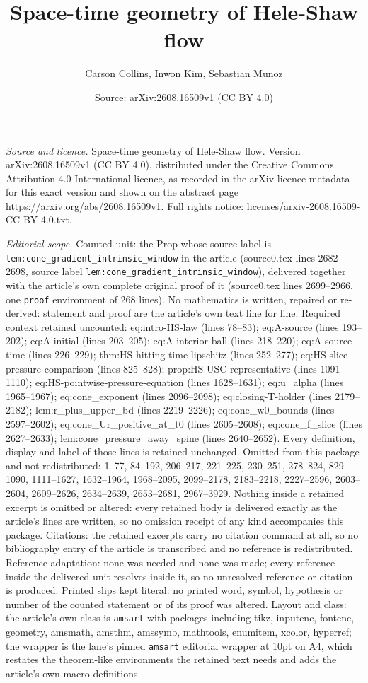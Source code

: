 \documentclass[10pt,a4paper]{amsart}
\title[Space-time geometry of Hele-Shaw flow]{Space-time geometry of Hele-Shaw flow}
\author{Carson Collins, Inwon Kim, Sebastian Munoz}
\date{Source: arXiv:2608.16509v1 (CC BY 4.0)}
\begin{document}
\maketitle

\noindent\emph{Source and licence.} Space-time geometry of Hele-Shaw flow. Version arXiv:2608.16509v1 (CC BY 4.0), distributed under the Creative Commons Attribution 4.0 International licence, as recorded in the arXiv licence metadata for this exact version and shown on the abstract page https://arxiv.org/abs/2608.16509v1. Full rights notice: licenses/arxiv-2608.16509-CC-BY-4.0.txt.\par\smallskip

\noindent\textit{Editorial scope.} Counted unit: the Prop whose source label is \texttt{lem:cone\_gradient\_intrinsic\_window} in the article (source0.tex lines 2682--2698, source label \texttt{lem:cone\_gradient\_intrinsic\_window}), delivered together with the article's own complete original proof of it (source0.tex lines 2699--2966, one \texttt{proof} environment of 268 lines). No mathematics is written, repaired or re-derived: statement and proof are the article's own text line for line. Required context retained uncounted: eq:intro-HS-law (lines 78--83); eq:A-source (lines 193--202); eq:A-initial (lines 203--205); eq:A-interior-ball (lines 218--220); eq:A-source-time (lines 226--229); thm:HS-hitting-time-lipschitz (lines 252--277); eq:HS-slice-pressure-comparison (lines 825--828); prop:HS-USC-representative (lines 1091--1110); eq:HS-pointwise-pressure-equation (lines 1628--1631); eq:u\_alpha (lines 1965--1967); eq:cone\_exponent (lines 2096--2098); eq:closing-T-holder (lines 2179--2182); lem:r\_plus\_upper\_bd (lines 2219--2226); eq:cone\_w0\_bounds (lines 2597--2602); eq:cone\_Ur\_positive\_at\_t0 (lines 2605--2608); eq:cone\_f\_slice (lines 2627--2633); lem:cone\_pressure\_away\_spine (lines 2640--2652). Every definition, display and label of those lines is retained unchanged. Omitted from this package and not redistributed: 1--77, 84--192, 206--217, 221--225, 230--251, 278--824, 829--1090, 1111--1627, 1632--1964, 1968--2095, 2099--2178, 2183--2218, 2227--2596, 2603--2604, 2609--2626, 2634--2639, 2653--2681, 2967--3929. Nothing inside a retained excerpt is omitted or altered: every retained body is delivered exactly as the article's lines are written, so no omission receipt of any kind accompanies this package. Citations: the retained excerpts carry no citation command at all, so no bibliography entry of the article is transcribed and no reference is redistributed. Reference adaptation: none was needed and none was made; every reference inside the delivered unit resolves inside it, so no unresolved reference or citation is produced. Printed slips kept literal: no printed word, symbol, hypothesis or number of the counted statement or of its proof was altered. Layout and class: the article's own class is \texttt{amsart} with packages including tikz, inputenc, fontenc, geometry, amsmath, amsthm, amssymb, mathtools, enumitem, xcolor, hyperref; the wrapper is the lane's pinned \texttt{amsart} editorial wrapper at 10pt on A4, which restates the theorem-like environments the retained text needs and adds the article's own macro definitions 
\end{document}
